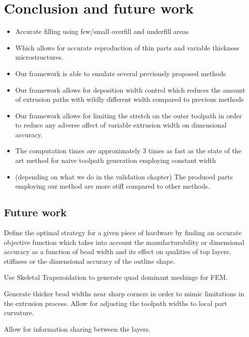 \section{Conclusion and future work}

\begin{itemize}
\item Accurate filling using few/small overfill and underfill areas
\item Which allows for accurate reproduction of thin parts and variable thickness microstructures.
\item Our framework is able to emulate several previously proposed methods
\item Our framework allows for deposition width control which reduces the amount of extrusion paths with wildly different width compared to previous methods
\item Our framework allows for limiting the stretch on the outer toolpath in order to reduce any adverse affect of variable extrusion width on dimensional accuracy.
\item The computation times are approximately 3 times as fast as the state of the art method for naive toolpath generation employing constant width
\item (depending on what we do in the validation chapter) The produced parts employing our method are more stiff compared to other methods.
\end{itemize}



\subsection{Future work}
Define the optimal strategy for a given piece of hardware by finding an accurate objective function which takes into account the manufacturability or dimensional accuracy as a function of bead width and its effect on qualities of top layers, stiffness or the dimensional accuracy of the outline shape.

Use Skeletal Trapezoidation to generate quad dominant meshings for FEM.

Generate thicker bead widths near sharp corners in order to mimic limitations in the extrusion process.
Allow for adjusting the toolpath widths to local part curvature.

Allow for information sharing between the layers.
